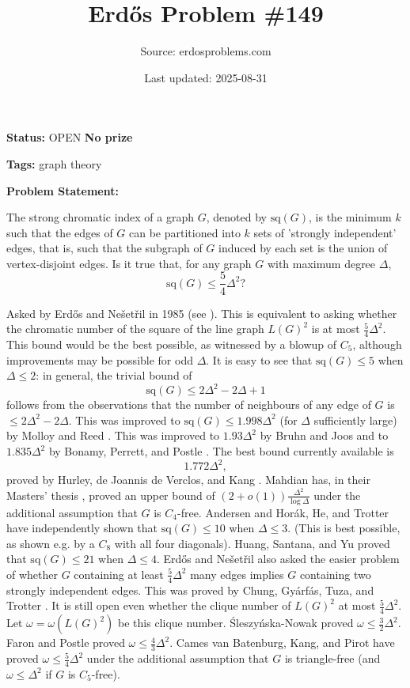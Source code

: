 \documentclass{article}
\title{Erd\H{o}s Problem \#149}
\date{Last updated: 2025-08-31}
\author{Source: erdosproblems.com}
\begin{document}
\maketitle

\noindent\textbf{Status:} OPEN \quad \textbf{No prize}

\noindent\textbf{Tags:} graph theory

\medskip

\noindent\textbf{Problem Statement:}

The strong chromatic index of a graph $G$, denoted by $\mathrm{sq}(G)$, is the minimum $k$ such that the edges of $G$ can be partitioned into $k$ sets of 'strongly independent' edges, that is, such that the subgraph of $G$ induced by each set is the union of vertex-disjoint edges. Is it true that, for any graph $G$ with maximum degree $\Delta$,\[\mathrm{sq}(G)\leq\frac{5}{4}\Delta^2?\]




Asked by Erd\H{o}s and Ne\v{s}et\v{r}il in 1985 (see \cite{FGST89}). This is equivalent to asking whether the chromatic number of the square of the line graph $L(G)^2$ is at most $\frac{5}{4}\Delta^2$. This bound would be the best possible, as witnessed by a blowup of $C_5$, although improvements may be possible for odd $\Delta$. It is easy to see that $\mathrm{sq}(G)\leq 5$ when $\Delta\leq 2$: in general, the trivial bound of\[\mathrm{sq}(G)\leq 2\Delta^2-2\Delta+1\]follows from the observations that the number of neighbours of any edge of $G$ is $\leq 2\Delta^2-2\Delta$. This was improved to $\mathrm{sq}(G)\leq 1.998\Delta^2$ (for $\Delta$ sufficiently large) by Molloy and Reed \cite{MoRe97}. This was improved to $1.93\Delta^2$ by Bruhn and Joos \cite{BrJo18} and to $1.835\Delta^2$ by Bonamy, Perrett, and Postle \cite{BPP22}. The best bound currently available is\[1.772\Delta^2,\]proved by Hurley, de Joannis de Verclos, and Kang \cite{HJK22}. Mahdian has, in their Masters' thesis , proved an upper bound of $(2+o(1))\frac{\Delta^2}{\log \Delta}$ under the additional assumption that $G$ is $C_4$-free. Andersen \cite{92} and Hor\'{a}k, He, and Trotter \cite{HHT93} have independently shown that $\mathrm{sq}(G)\leq 10$ when $\Delta\leq 3$. (This is best possible, as shown e.g. by a $C_8$ with all four diagonals). Huang, Santana, and Yu \cite{HSY18} proved that $\mathrm{sq}(G)\leq 21$ when $\Delta\leq 4$. Erd\H{o}s and Ne\v{s}et\v{r}il also asked the easier problem of whether $G$ containing at least $\tfrac{5}{4}\Delta^2$ many edges implies $G$ containing two strongly independent edges. This was proved by Chung, Gy\'{a}rf\'{a}s, Tuza, and Trotter \cite{CGTT90}. It is still open even whether the clique number of $L(G)^2$ at most $\frac{5}{4}\Delta^2$. Let $\omega=\omega(L(G)^2)$ be this clique number. \'{S}leszy\'{n}ska-Nowak \cite{Sl16} proved $\omega \leq \frac{3}{2}\Delta^2$. Faron and Postle \cite{FaPo19} proved $\omega\leq \frac{4}{3}\Delta^2$. Cames van Batenburg, Kang, and Pirot \cite{CKP20} have proved $\omega\leq \frac{5}{4}\Delta^2$ under the additional assumption that $G$ is triangle-free (and $\omega\leq \Delta^2$ if $G$ is $C_5$-free).
\end{document}
